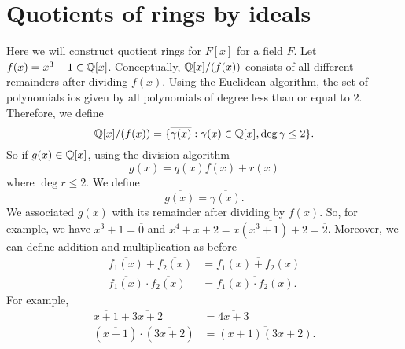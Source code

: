 \section{Quotients of rings by ideals}

\begin{example}
    Here we will construct quotient rings for $F[x]$ for a field $F$. 
    Let $f(x) = x^3 + 1 \in \mathbb{Q}[x]$. 
    Conceptually, $\mathbb{Q}[x]/(f(x))$ consists of all different remainders after dividing $f(x)$. 
    Using the Euclidean algorithm, the set of polynomials ios given by all polynomials of degree less than or equal to $2$. 
    Therefore, we define
    \[ \mathbb{Q}[x] / (f(x)) = \{ \overline{\gamma(x)} : \gamma(x) \in \mathbb{Q}[x], \deg{\gamma} \leq 2 \}. \]
    So if $g(x) \in \mathbb{Q}[x]$, using the division algorithm
    \[ g(x) = q(x) f(x) + r(x) \]
    where $\deg{r} \leq 2$.
    We define
    \[ \overline{g(x)} = \overline{\gamma(x)}. \]
    We associated $g(x)$ with its remainder after dividing by $f(x)$. So, for example, we have $\overline{x^3 + 1} = \overline 0$ and $\overline{x^4 + x + 2} = \overline{x(x^3 + 1) + 2} = \overline 2$. Moreover, we can define addition and multiplication as before
    \begin{align*}
        \overline{f_1(x)} + \overline{f_2(x)} &= \overline{f_1(x) + f_2(x)} \\
        \overline{f_1(x)} \cdot \overline{f_2(x)} &= \overline{f_1(x) \cdot f_2(x)}.
    \end{align*}
    For example,
    \begin{align*}
        \overline{x + 1} + \overline{3x + 2} &= \overline{4x + 3} \\
        (\overline{x + 1}) \cdot (\overline{3x + 2}) &= \overline{(x+1)(3x+2)}.
    \end{align*}
\end{example}
